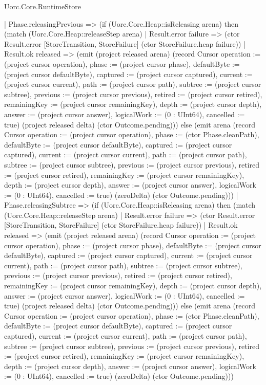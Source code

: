 \begin{lexlean}{Uorc.Core.RuntimeStore}
\begin{semanticmodule}
{    | Phase.releasingPrevious => (if (Uorc.Core.Heap::isReleasing arena) then (match (Uorc.Core.Heap::releaseStep arena)
      | Result.error failure => (ctor Result.error [StoreTransition, StoreFailure] (ctor StoreFailure.heap failure))
      | Result.ok released => (emit (project released arena) (record Cursor {operation := (project cursor operation), phase := (project cursor phase), defaultByte := (project cursor defaultByte), captured := (project cursor captured), current := (project cursor current), path := (project cursor path), subtree := (project cursor subtree), previous := (project cursor previous), retired := (project cursor retired), remainingKey := (project cursor remainingKey), depth := (project cursor depth), answer := (project cursor answer), logicalWork := (0 : UInt64), cancelled := true}) (project released delta) (ctor Outcome.pending))) else (emit arena (record Cursor {operation := (project cursor operation), phase := (ctor Phase.cleanPath), defaultByte := (project cursor defaultByte), captured := (project cursor captured), current := (project cursor current), path := (project cursor path), subtree := (project cursor subtree), previous := (project cursor previous), retired := (project cursor retired), remainingKey := (project cursor remainingKey), depth := (project cursor depth), answer := (project cursor answer), logicalWork := (0 : UInt64), cancelled := true}) (zeroDelta) (ctor Outcome.pending)))
    | Phase.releasingSubtree => (if (Uorc.Core.Heap::isReleasing arena) then (match (Uorc.Core.Heap::releaseStep arena)
      | Result.error failure => (ctor Result.error [StoreTransition, StoreFailure] (ctor StoreFailure.heap failure))
      | Result.ok released => (emit (project released arena) (record Cursor {operation := (project cursor operation), phase := (project cursor phase), defaultByte := (project cursor defaultByte), captured := (project cursor captured), current := (project cursor current), path := (project cursor path), subtree := (project cursor subtree), previous := (project cursor previous), retired := (project cursor retired), remainingKey := (project cursor remainingKey), depth := (project cursor depth), answer := (project cursor answer), logicalWork := (0 : UInt64), cancelled := true}) (project released delta) (ctor Outcome.pending))) else (emit arena (record Cursor {operation := (project cursor operation), phase := (ctor Phase.cleanPath), defaultByte := (project cursor defaultByte), captured := (project cursor captured), current := (project cursor current), path := (project cursor path), subtree := (project cursor subtree), previous := (project cursor previous), retired := (project cursor retired), remainingKey := (project cursor remainingKey), depth := (project cursor depth), answer := (project cursor answer), logicalWork := (0 : UInt64), cancelled := true}) (zeroDelta) (ctor Outcome.pending)))
}
\end{semanticmodule}
\end{lexlean}
